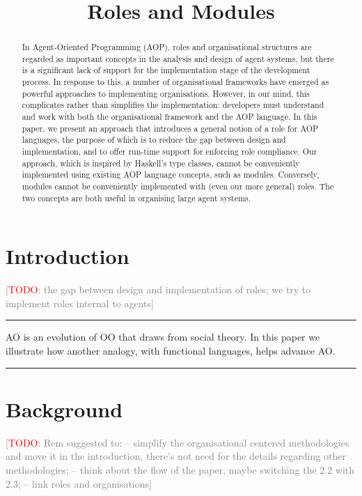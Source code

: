 \documentclass[conference,compsoc]{IEEEtran}
\title{Roles and Modules}
\author{
  \IEEEauthorblockN{Rem Collier and Claudia Grigore} 
  \IEEEauthorblockA{
    School of Computer Science and Informatics\\
    University College Dublin\\
    Belfield Campus, Dublin~4, Ireland\\
    Email: rem.collier@ucd.ie, claudia.grigore@ucdconnect.ie}}
\newcommand{\todo}[1]{{\small \textcolor{gray}{[\textcolor{red}{TODO}: #1]}}}
\newenvironment{notes}{\medskip\hrule\nobreak\smallskip\narrower}{\smallskip\hrule\medskip}
\begin{document}
\maketitle

\begin{abstract}

In Agent-Oriented Programming (AOP), roles and organisational structures
are regarded as important concepts in the analysis and design of agent
systems, but there is a significant lack of support for the implementation
stage of the development process. In response to this, a number of
organisational frameworks have emerged as powerful approaches to
implementing organisations. However, in our mind, this complicates rather
than simplifies the implementation: developers must understand and work
with both the organisational framework and the AOP language. In this paper,
we present an approach that introduces a general notion of a role for AOP
languages, the purpose of which is to reduce the gap between design and
implementation, and to offer run-time support for enforcing role
compliance. Our approach, which is inspired by Haskell's type classes,
cannot be conveniently implemented using existing AOP language concepts,
such as modules. Conversely, modules cannot be conveniently implemented
with (even our more general) roles. The two concepts are both useful in
organising large agent systems.  

\end{abstract}

\section{Introduction}

\todo{the gap between design and implementation of roles; we try to implement roles internal to agents}

\begin{notes}
AO is an evolution of OO that draws from social theory. In this paper we
illustrate how another analogy, with functional languages, helps advance 
AO\null. 
\end{notes}

\section{Background}

\todo{Rem suggested to: -- simplify the organisational centered methodologies and move it in the introduction, there's not need for the details regarding other methodologies; -- think about the flow of the paper, maybe switching the 2.2 with 2.3; -- link roles and organisations}
\end{document}
